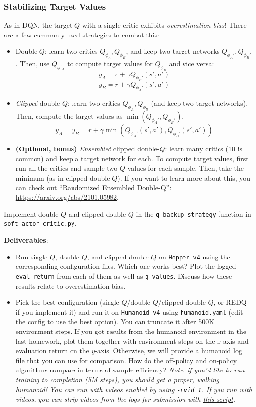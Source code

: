 \subsubsection{Stabilizing Target Values}
As in DQN, the target $Q$ with a single critic exhibits \textit{overestimation bias}! There are a few commonly-used strategies to combat this:
\begin{itemize}
    \item Double-$Q$: learn two critics $Q_{\phi_A}, Q_{\phi_B}$, and keep two target networks $Q_{\phi_A'}, Q_{\phi_B'}$. Then, use $Q_{\phi'_A}$ to compute target values for $Q_{\phi_B}$ and vice versa:
    \[y_A = r + \gamma Q_{\phi_B'}(s', a')\]
    \[y_B = r + \gamma Q_{\phi_A'}(s', a')\]
    \item \textit{Clipped} double-$Q$: learn two critics $Q_{\phi_A}, Q_{\phi_B}$ (and keep two target networks). Then, compute the target values as $\min(Q_{\phi_A'}, Q_{\phi_B'})$.
    \[y_A = y_B = r + \gamma \min\left(Q_{\phi_A'}(s', a'), Q_{\phi_B'}(s', a')\right)\]
    \item \textbf{(Optional, bonus)} \textit{Ensembled} clipped double-$Q$: learn many critics (10 is common) and keep a target network for each. To compute target values, first run all the critics and sample two $Q$-values for each sample. Then, take the minimum (as in clipped double-$Q$). If you want to learn more about this, you can check out ``Randomized Ensembled Double-Q'': \url{https://arxiv.org/abs/2101.05982}.
\end{itemize}
Implement double-$Q$ and clipped double-$Q$ in the \verb|q_backup_strategy| function in \verb|soft_actor_critic.py|.

\textbf{Deliverables}:
\begin{itemize}
    \item Run single-$Q$, double-$Q$, and clipped double-$Q$ on \verb|Hopper-v4| using the corresponding configuration files. Which one works best? Plot the logged \verb|eval_return| from each of them as well as \verb|q_values|. Discuss how these results relate to overestimation bias.
    \item Pick the best configuration (single-$Q$/double-$Q$/clipped double-$Q$, or REDQ if you implement it) and run it on \verb|Humanoid-v4| using \verb|humanoid.yaml| (edit the config to use the best option). You can truncate it after 500K environment steps. If you got results from the humanoid environment in the last homework, plot them together with environment steps on the $x$-axis and evaluation return on the $y$-axis. Otherwise, we will provide a humanoid log file that you can use for comparison. How do the off-policy and on-policy algorithms compare in terms of sample efficiency? \textit{Note: if you'd like to run training to completion (5M steps), you should get a proper, walking humanoid! You can run with videos enabled by using \texttt{-nvid 1}. If you run with videos, you can strip videos from the logs for submission with \href{https://gist.github.com/kylestach/e9964f5f34ee74367547dec83eaf5fae}{this script}.}
\end{itemize}

